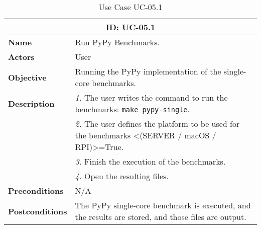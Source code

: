 \begin{table}[H]
    \centering
    \begin{tabular}{l p{10cm}}
        \toprule
        \multicolumn{2}{c}{\textbf{ID: UC-05.1}} \\
        \toprule
        \textbf{Name}                         &  Run PyPy Benchmarks. \\
        \textbf{Actors}                       &  User \\
        \textbf{Objective}                    &  Running the PyPy implementation of the single-core benchmarks. \\
        \multirow{1}{*}{\textbf{Description}} & \textsl{1.} The user writes the command to run the benchmarks: \texttt{make pypy-single}.\\
                                              & \textsl{2.} The user defines the platform to be used for the benchmarks <(SERVER / macOS / RPI)>=True.\\
                                              & \textsl{3.} Finish the execution of the benchmarks.\\
                                              & \textsl{4.} Open the resulting files.\\
        \textbf{Preconditions}                &  N/A \\
        \textbf{Postconditions}               &  The PyPy single-core benchmark is executed, and the results are stored, and those files are output. \\
    \end{tabular}
    \caption{Use Case UC-05.1}
    \label{tab:uc-05.1}
\end{table}

